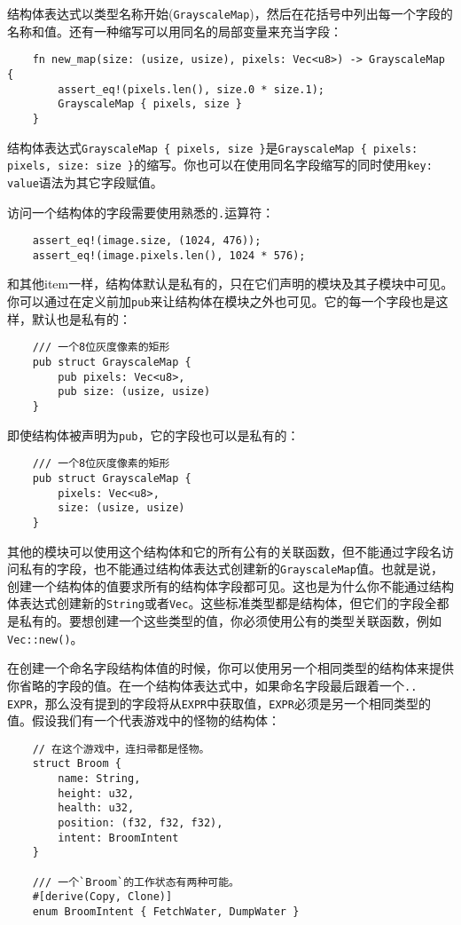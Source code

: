 结构体表达式以类型名称开始(\texttt{GrayscaleMap})，然后在花括号中列出每一个字段的名称和值。还有一种缩写可以用同名的局部变量来充当字段：
\begin{verbatim}
    fn new_map(size: (usize, usize), pixels: Vec<u8>) -> GrayscaleMap {
        assert_eq!(pixels.len(), size.0 * size.1);
        GrayscaleMap { pixels, size }
    }
\end{verbatim}

结构体表达式\texttt{GrayscaleMap \{ pixels, size \}}是\texttt{GrayscaleMap \{ pixels: pixels, size: size \}}的缩写。你也可以在使用同名字段缩写的同时使用\texttt{key: value}语法为其它字段赋值。

访问一个结构体的字段需要使用熟悉的\texttt{.}运算符：
\begin{verbatim}
    assert_eq!(image.size, (1024, 476));
    assert_eq!(image.pixels.len(), 1024 * 576);
\end{verbatim}

和其他item一样，结构体默认是私有的，只在它们声明的模块及其子模块中可见。你可以通过在定义前加\texttt{pub}来让结构体在模块之外也可见。它的每一个字段也是这样，默认也是私有的：
\begin{verbatim}
    /// 一个8位灰度像素的矩形
    pub struct GrayscaleMap {
        pub pixels: Vec<u8>,
        pub size: (usize, usize)
    }
\end{verbatim}

即使结构体被声明为\texttt{pub}，它的字段也可以是私有的：
\begin{verbatim}
    /// 一个8位灰度像素的矩形
    pub struct GrayscaleMap {
        pixels: Vec<u8>,
        size: (usize, usize)
    }
\end{verbatim}

其他的模块可以使用这个结构体和它的所有公有的关联函数，但不能通过字段名访问私有的字段，也不能通过结构体表达式创建新的\texttt{GrayscaleMap}值。也就是说，创建一个结构体的值要求所有的结构体字段都可见。这也是为什么你不能通过结构体表达式创建新的\texttt{String}或者\texttt{Vec}。这些标准类型都是结构体，但它们的字段全都是私有的。要想创建一个这些类型的值，你必须使用公有的类型关联函数，例如\texttt{Vec::new()}。

在创建一个命名字段结构体值的时候，你可以使用另一个相同类型的结构体来提供你省略的字段的值。在一个结构体表达式中，如果命名字段最后跟着一个\texttt{.. EXPR}，那么没有提到的字段将从\texttt{EXPR}中获取值，\texttt{EXPR}必须是另一个相同类型的值。假设我们有一个代表游戏中的怪物的结构体：
\begin{verbatim}
    // 在这个游戏中，连扫帚都是怪物。
    struct Broom {
        name: String,
        height: u32,
        health: u32,
        position: (f32, f32, f32),
        intent: BroomIntent
    }

    /// 一个`Broom`的工作状态有两种可能。
    #[derive(Copy, Clone)]
    enum BroomIntent { FetchWater, DumpWater }
\end{verbatim}

